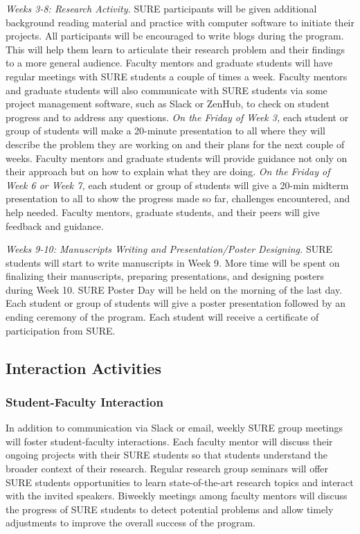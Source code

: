 \documentclass[11pt]{NSFamsart}
\begin{document}
\noindent \emph{Weeks 3-8: Research Activity.}
SURE participants will be given additional background
reading material and practice with computer software to initiate their projects. All participants will be encouraged to write blogs \cite{Hig21a} during the program. This will help them learn to articulate their research problem and their findings to a more general audience. Faculty mentors and graduate
students will have regular meetings with SURE students a couple of times a week. Faculty mentors and graduate students will also communicate with SURE students via some project management software, such as Slack or ZenHub, to check on student progress and to address any questions. 
\emph{On the Friday of Week 3,}
each student or group of students will make a 20-minute presentation to all where they will describe the problem they are working on and their plans for the next couple of weeks. Faculty mentors and
graduate students will provide guidance not only on their approach but on how to explain what they are doing.
\emph{On the Friday of Week 6 or Week 7,}
each student or group of students will give a 20-min midterm presentation to all to show the progress made so far, challenges encountered, and help needed. Faculty mentors,
graduate students, and their peers will give feedback and guidance.

\noindent \emph{Weeks 9-10: Manuscripts Writing and Presentation/Poster Designing.} SURE students will start to
write manuscripts in Week 9. More time will be spent on finalizing their manuscripts, preparing presentations, and designing posters during Week 10. SURE Poster Day will be held on the morning of the last day. Each student or group of students will give a poster presentation followed by an ending ceremony of the program. Each student will receive a certificate of participation from  SURE.

\subsection{Interaction Activities}
\subsubsection{Student-Faculty Interaction}
In addition to communication via Slack or email, weekly SURE group meetings will foster student-faculty interactions.  Each
faculty mentor will discuss their ongoing projects with their SURE students so that students understand the broader context of their research. Regular research group seminars
will offer SURE students opportunities to learn state-of-the-art research topics and interact
with the invited speakers.
Biweekly meetings among faculty mentors
will discuss the progress of SURE students to detect potential problems and allow
timely adjustments to improve the overall success of the program.
\end{document}
